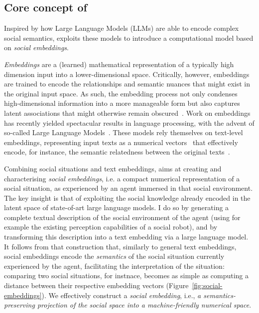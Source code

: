 \subsection{Core concept of \project}

Inspired by how Large Language Models (LLMs) are able to encode complex social
semantics, \project exploits these models to introduce a computational model
based on \emph{social embeddings}.

\emph{Embeddings} are a (learned)
mathematical representation of a typically high dimension input into a
lower-dimensional space. Critically, however, embeddings
are trained to encode the relationships and semantic nuances that might exist in
the original input space.
As such, the embedding process not
only condenses high-dimensional information into a more manageable form but also
captures latent associations that might otherwise remain
obscured~\cite{bengio2009learning}.
Work on embeddings has recently yielded spectacular results in language
processing, with the advent of so-called Large Language
Models~\cite{devlin2019bert,wolf2020transformers}. These models rely themselves
on text-level embeddings, representing input texts as a numerical
vectors~\cite{reimers2019sentencebert,muennighoff2022sgpt} that effectively
encode, for instance, the semantic relatedness between the original texts~\cite{thakur2021beir}.

Combining social situations and text embeddings, \project aims at creating and
characterising \emph{social embeddings}, i.e. a compact numerical
representation of a social situation, as experienced by an agent
immersed in that social environment. 
The key insight is that of exploiting the social knowledge already encoded in
the latent space of state-of-art large language models. I do so by
generating a complete textual description of the social environment of the agent
(using for example the existing perception capabilities of a social robot), and
by transforming this description into a text embedding via a large language
model.  It follows from that construction that, similarly to general text
embeddings, social embeddings encode the \emph{semantics} of the social
situation currently experienced by the agent, facilitating the interpretation of
the situation: comparing two social situations, for instnace, becomes as
simple as computing a distance between their respective embedding vectors
(Figure~\ref{fig:social-embeddings}). We effectively construct a \emph{social
embedding}, i.e., \emph{a semantics-preserving projection of the social space
into a machine-friendly numerical space}.


